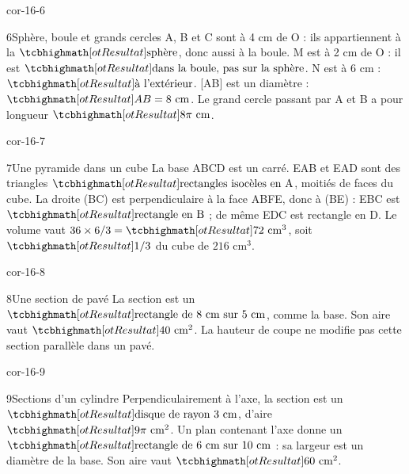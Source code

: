 \begin{blocLivre}{cor-16-6}\begin{corrige}{6}{Sphère, boule et grands cercles}
A, B et C sont à 4 cm de O : ils appartiennent à la $\res{\text{sphère}}$, donc aussi à la boule. M est à 2 cm de O : il est $\res{\text{dans la boule, pas sur la sphère}}$. N est à 6 cm : $\res{\text{à l’extérieur}}$. [AB] est un diamètre : $\res{AB=8\text{ cm}}$. Le grand cercle passant par A et B a pour longueur $\res{8\pi\text{ cm}}$.
\label{fig-cor-16-6}
\end{corrige}\end{blocLivre}
\begin{blocLivre}{cor-16-7}\begin{corrige}{7}{Une pyramide dans un cube}
La base ABCD est un carré. EAB et EAD sont des triangles $\res{\text{rectangles isocèles en A}}$, moitiés de faces du cube. La droite (BC) est perpendiculaire à la face ABFE, donc à (BE) : EBC est $\res{\text{rectangle en B}}$ ; de même EDC est rectangle en D. Le volume vaut $36\times6/3=\res{72\text{ cm}^3}$, soit $\res{1/3}$ du cube de $216\text{ cm}^3$.
\label{fig-cor-16-7}
\end{corrige}\end{blocLivre}
\begin{blocLivre}{cor-16-8}\begin{corrige}{8}{Une section de pavé}
La section est un $\res{\text{rectangle de 8 cm sur 5 cm}}$, comme la base. Son aire vaut $\res{40\text{ cm}^2}$. La hauteur de coupe ne modifie pas cette section parallèle dans un pavé.
\label{fig-cor-16-8}
\end{corrige}\end{blocLivre}
\begin{blocLivre}{cor-16-9}\begin{corrige}{9}{Sections d’un cylindre}
Perpendiculairement à l’axe, la section est un $\res{\text{disque de rayon 3 cm}}$, d’aire $\res{9\pi\text{ cm}^2}$. Un plan contenant l’axe donne un $\res{\text{rectangle de 6 cm sur 10 cm}}$ : sa largeur est un diamètre de la base. Son aire vaut $\res{60\text{ cm}^2}$.
\label{fig-cor-16-9}
\end{corrige}\end{blocLivre}
